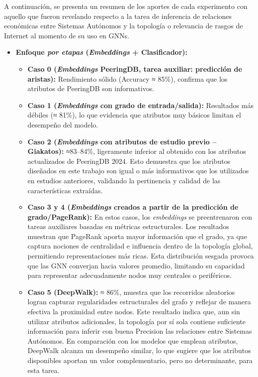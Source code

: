 A continuación, se presenta un resumen de los aportes de cada experimento con aquello que fueron revelando respecto a la tarea de inferencia de relaciones económicas entre Sistemas Autónomos y la topología o relevancia de rasgos de Internet al momento de su uso en GNNs.
\vspace{0.5cm}
\begin{itemize}
    \item \textbf{Enfoque \textit{por etapas} (\textit{Embeddings} + Clasificador):}

    \begin{itemize}
        \item \textbf{Caso 0 (\textit{Embeddings} PeeringDB, tarea auxiliar: predicción de aristas):} Rendimiento sólido (Accuracy ≈ 85\%), confirma que los atributos de PeeringDB son informativos.

        \item \textbf{Caso 1 (\textit{Embeddings} con grado de entrada/salida):} Resultados más débiles (≈ 81\%), lo que evidencia que atributos muy básicos limitan el desempeño del modelo.

        \item \textbf{Caso 2 (\textit{Embeddings} con atributos de estudio previo – Giakatos):} ≈83–84\%, ligeramente inferior al obtenido con los atributos actualizados de PeeringDB 2024.
        Esto demuestra que los atributos diseñados en este trabajo son igual o más informativos que los utilizados en estudios anteriores, validando la pertinencia y calidad de las características extraídas.

        \item \textbf{Caso 3 y 4 (\textit{Embeddings} creados a partir de la predicción de grado/PageRank):}
        En estos casos, los \textit{embeddings} se preentrenaron con tareas auxiliares basadas en métricas estructurales.
        Los resultados muestran que PageRank aporta mayor información que el grado, ya que captura nociones de centralidad e influencia dentro de la topología global, permitiendo representaciones más ricas.
        Esta distribución sesgada provoca que las GNN converjan hacia valores promedio, limitando su capacidad para representar adecuadamente nodos muy centrales o periféricos.
        
        
        \item \textbf{Caso 5 (DeepWalk):} ≈ 86\%, muestra que los recorridos aleatorios logran capturar regularidades estructurales del grafo y reflejar de manera efectiva la proximidad entre nodos.
        Este resultado indica que, aun sin utilizar atributos adicionales, la topología por sí sola contiene suficiente información para inferir con buena Precision las relaciones entre Sistemas Autónomos.
        En comparación con los modelos que emplean atributos, DeepWalk alcanza un desempeño similar, lo que sugiere que los atributos disponibles aportan un valor complementario, pero no determinante, para esta tarea.


\end{itemize}
\end{itemize}
